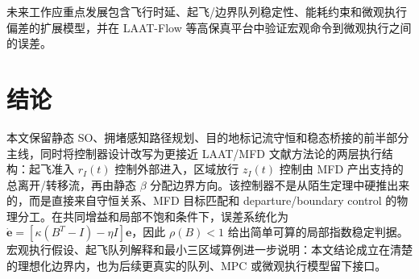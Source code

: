 \documentclass[a4paper,12pt]{article}
\theoremstyle{plain}
\theoremstyle{definition}
\theoremstyle{remark}
\begin{document}
未来工作应重点发展包含飞行时延、起飞/边界队列稳定性、能耗约束和微观执行偏差的扩展模型，并在 LAAT-Flow 等高保真平台中验证宏观命令到微观执行之间的误差。

\section{结论}

本文保留静态 SO、拥堵感知路径规划、目的地标记流守恒和稳态桥接的前半部分主线，同时将控制器设计改写为更接近 LAAT/MFD 文献方法论的两层执行结构：起飞准入 $r_I(t)$ 控制外部进入，区域放行 $z_I(t)$ 控制由 MFD 产出支持的总离开/转移流，再由静态 $\beta$ 分配边界方向。该控制器不是从陌生定理中硬推出来的，而是直接来自守恒关系、MFD 目标匹配和 departure/boundary control 的物理分工。在共同增益和局部不饱和条件下，误差系统化为 $\dot{\bm e}=[\kappa(B^T-I)-\eta I]\bm e$，因此 $\rho(B)<1$ 给出简单可算的局部指数稳定判据。宏观执行假设、起飞队列解释和最小三区域算例进一步说明：本文结论成立在清楚的理想化边界内，也为后续更真实的队列、MPC 或微观执行模型留下接口。
\end{document}
